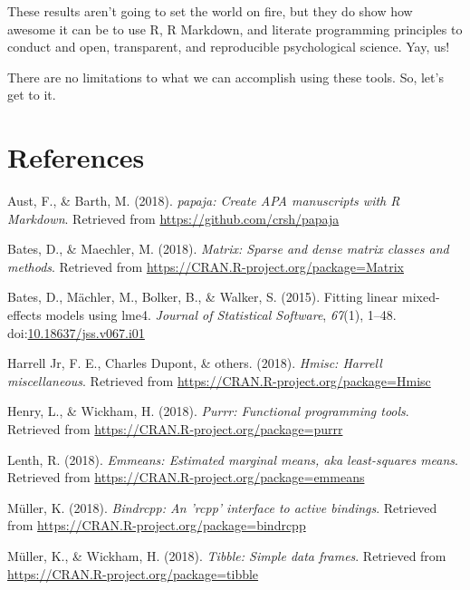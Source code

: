 \documentclass[english,man]{apa6}
\theoremstyle{definition}
\theoremstyle{definition}
\theoremstyle{definition}
\theoremstyle{remark}
\begin{document}
These results aren't going to set the world on fire, but they do show
how awesome it can be to use R, R Markdown, and literate programming
principles to conduct and open, transparent, and reproducible
psychological science. Yay, us!

There are no limitations to what we can accomplish using these tools.
So, let's get to it.

\newpage

\section{References}\label{references}

\setlength{\parindent}{-0.5in} \setlength{\leftskip}{0.5in}

\hypertarget{refs}{}
\hypertarget{ref-R-papaja}{}
Aust, F., \& Barth, M. (2018). \emph{papaja: Create APA manuscripts with
R Markdown}. Retrieved from \url{https://github.com/crsh/papaja}

\hypertarget{ref-R-Matrix}{}
Bates, D., \& Maechler, M. (2018). \emph{Matrix: Sparse and dense matrix
classes and methods}. Retrieved from
\url{https://CRAN.R-project.org/package=Matrix}

\hypertarget{ref-R-lme4}{}
Bates, D., Mächler, M., Bolker, B., \& Walker, S. (2015). Fitting linear
mixed-effects models using lme4. \emph{Journal of Statistical Software},
\emph{67}(1), 1--48.
doi:\href{https://doi.org/10.18637/jss.v067.i01}{10.18637/jss.v067.i01}

\hypertarget{ref-R-Hmisc}{}
Harrell Jr, F. E., Charles Dupont, \& others. (2018). \emph{Hmisc:
Harrell miscellaneous}. Retrieved from
\url{https://CRAN.R-project.org/package=Hmisc}

\hypertarget{ref-R-purrr}{}
Henry, L., \& Wickham, H. (2018). \emph{Purrr: Functional programming
tools}. Retrieved from \url{https://CRAN.R-project.org/package=purrr}

\hypertarget{ref-R-emmeans}{}
Lenth, R. (2018). \emph{Emmeans: Estimated marginal means, aka
least-squares means}. Retrieved from
\url{https://CRAN.R-project.org/package=emmeans}

\hypertarget{ref-R-bindrcpp}{}
Müller, K. (2018). \emph{Bindrcpp: An 'rcpp' interface to active
bindings}. Retrieved from
\url{https://CRAN.R-project.org/package=bindrcpp}

\hypertarget{ref-R-tibble}{}
Müller, K., \& Wickham, H. (2018). \emph{Tibble: Simple data frames}.
Retrieved from \url{https://CRAN.R-project.org/package=tibble}
\end{document}
